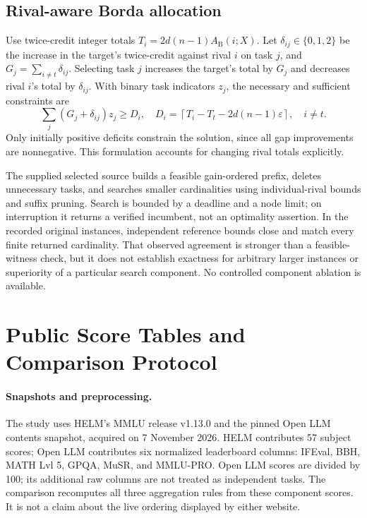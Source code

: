 \documentclass{article}
\newcommand{\tol}{\varepsilon}
\begin{document}
\subsection{Rival-aware Borda allocation}
Use twice-credit integer totals $T_i=2d(n-1)A_{\mathrm{B}}(i;X)$. Let $\delta_{ij}\in\{0,1,2\}$ be the increase in the target's twice-credit against rival $i$ on task $j$, and $G_j=\sum_{i\ne t}\delta_{ij}$. Selecting task $j$ increases the target's total by $G_j$ and decreases rival $i$'s total by $\delta_{ij}$. With binary task indicators $z_j$, the necessary and sufficient constraints are
\begin{equation}
 \sum_j (G_j+\delta_{ij})z_j\geq D_i,
 \quad D_i=\left\lceil T_i-T_t-2d(n-1)\tol\right\rceil,
 \quad i\ne t.
 \label{eq:cover}
\end{equation}
Only initially positive deficits constrain the solution, since all gap improvements are nonnegative. This formulation accounts for changing rival totals explicitly.

The supplied selected source builds a feasible gain-ordered prefix, deletes unnecessary tasks, and searches smaller cardinalities using individual-rival bounds and suffix pruning. Search is bounded by a deadline and a node limit; on interruption it returns a verified incumbent, not an optimality assertion. In the recorded original instances, independent reference bounds close and match every finite returned cardinality. That observed agreement is stronger than a feasible-witness check, but it does not establish exactness for arbitrary larger instances or superiority of a particular search component. No controlled component ablation is available.

\section{Public Score Tables and Comparison Protocol}
\paragraph{Snapshots and preprocessing.}
The study uses HELM's MMLU release v1.13.0 and the pinned Open LLM contents snapshot, acquired on 7 November 2026. HELM contributes 57 subject scores; Open LLM contributes six normalized leaderboard columns: IFEval, BBH, MATH Lvl 5, GPQA, MuSR, and MMLU-PRO. Open LLM scores are divided by 100; its additional raw columns are not treated as independent tasks. The comparison recomputes all three aggregation rules from these component scores. It is not a claim about the live ordering displayed by either website.
\end{document}
